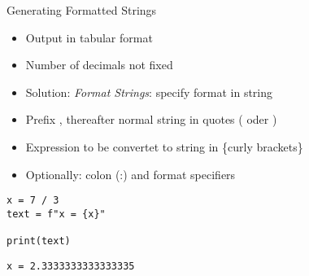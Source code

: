 
\begin{frame}[fragile]{Generating Formatted Strings}
%
\begin{itemize}
\item Output in tabular format
\item Number of decimals not fixed
\item Solution: \emph{Format Strings}: specify format in string
\item Prefix , thereafter normal string in quotes ( oder )
\item Expression to be convertet to string in \{curly brackets\}
\item Optionally: colon (:) and format specifiers
\end{itemize}

\vspace{6pt}
\begin{codebox}[Code: Format Strings (1), width=.5\linewidth, nobeforeafter, equal height group = grpFormatString1]
\begin{verbatim}
x = 7 / 3
text = f"x = {x}"

print(text)
\end{verbatim}
\end{codebox}
%
\begin{cmdbox}[Output: Format Strings (1), width=.49\linewidth, nobeforeafter, equal height group = grpFormatString1]
\begin{verbatim}
x = 2.3333333333333335
\end{verbatim}
\end{cmdbox}
%
\end{frame}


